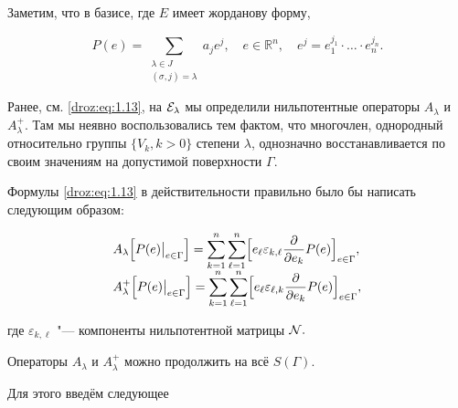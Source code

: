 Заметим, что в базисе, где $E$ имеет жорданову форму,

\begin{equation*}


P(e)=\sum_{\substack{  \lambda \in J\\ (\sigma,j)=\lambda  } }a_je^j,\quad e \in \mathbb R^n,\quad  e^j=e_1^{j_1}\cdot \dots \cdot e_n^{j_n}.

\end{equation*}



Ранее, см. \eqref{droz:eq:1.13}, на ${\cal E}_{\lambda}$ мы определили нильпотентные операторы $A_{\lambda}$ и $A_{\lambda}^{+}.$ Там мы неявно воспользовались тем фактом, что многочлен, однородный относительно группы $\{V_k, k>0\}$ степени $\lambda$, однозначно восстанавливается по своим значениям на допустимой поверхности $\Gamma.$ 

Формулы \eqref{droz:eq:1.13} в действительности правильно было бы написать следующим образом:

\begin{equation}

\label{droz:eq:2.4}

\begin{array}{l}

\displaystyle

A_{\lambda}\Bigl[P(e)\big|_{e\in \Gamma}\Bigr] =\sum_{k=1}^n\sum_{\ell=1}^n \Bigl[e_{\ell} \varepsilon_{k,\ell} \frac{\partial}{\partial e_k}P(e)\Bigr]_{e\in \Gamma},\\

\displaystyle

A_{\lambda}^{+}\Bigl[P(e)\big|_{e\in \Gamma}\Bigr]= \sum_{k=1}^n\sum_{\ell=1}^n \Bigl[e_{\ell} \varepsilon_{\ell,k} \frac{\partial}{\partial e_k}

P(e)\Bigr]_{e\in \Gamma},

\end{array}

\end{equation}

где $\varepsilon_{k,\ell}$ "--- компоненты нильпотентной матрицы ${\cal N}.$







Операторы $A_{\lambda}$ и $A_{\lambda}^{+}$ можно продолжить на всё $S(\Gamma).$ 

Для этого введём следующее



